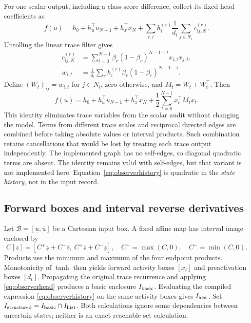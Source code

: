 \documentclass[11pt,a4paper]{article}
\theoremstyle{definition}\newtheorem{definition}[theorem]{Definition}
\begin{document}
For one scalar output, including a class-score difference, collect its fixed head coefficients as
\begin{equation}
 f(u)=h_0+h_u^\top u_{N-1}+h_x^\top x_N
       +\sum_{r,i}h^{(r)}_i\frac1{d_i}\sum_{j\in N_i}c^{(r)}_{ij,N}.
 \label{eq:observerhead}
\end{equation}
Unrolling the linear trace filter gives
\begin{align}
 c^{(r)}_{ij,N}&=\sum_{t=0}^{N-1}\beta_r(1-\beta_r)^{N-1-t}x_{i,t}x_{j,t},\\
 w_{i,t}&=\frac1{d_i}\sum_r h^{(r)}_i\beta_r(1-\beta_r)^{N-1-t}. \label{eq:tracecompile}
\end{align}
Define $(W_t)_{ij}=w_{i,t}$ for $j\in N_i$, zero otherwise, and $M_t=W_t+W_t^\top$. Then
\begin{equation}
 f(u)=h_0+h_u^\top u_{N-1}+h_x^\top x_N
                    +\frac12\sum_{t=0}^{N-1}x_t^\top M_tx_t.
 \label{eq:observerhistory}
\end{equation}
This identity eliminates trace variables from the scalar audit without changing the model. Terms from different trace scales and reciprocal directed edges are combined before taking absolute values or interval products. Such combination retains cancellations that would be lost by treating each trace output independently. The implemented graph has no self-edges, so diagonal quadratic terms are absent. The identity remains valid with self-edges, but that variant is not implemented here. Equation~\eqref{eq:observerhistory} is quadratic in the \emph{state history}, not in the input record.

\subsection{Forward boxes and interval reverse derivatives}
Let $\mathcal B=[\underline u,\overline u]$ be a Cartesian input box. A fixed affine map has interval image enclosed by
\[
 C[z]=[C^+\underline z+C^-\overline z,\ C^+\overline z+C^-\underline z],
 \quad C^+=\max(C,0),\quad C^-=\min(C,0).
\]
Products use the minimum and maximum of the four endpoint products. Monotonicity of $\tanh$ then yields forward activity boxes $[x_t]$ and preactivation boxes $[d_t]$. Propagating the original trace recurrence and applying \eqref{eq:observerhead} produces a basic enclosure $I_{\rm basic}$. Evaluating the compiled expression \eqref{eq:observerhistory} on the same activity boxes gives $I_{\rm hist}$. Set $I_{\rm structured}=I_{\rm basic}\cap I_{\rm hist}$. Both calculations ignore some dependencies between uncertain states; neither is an exact reachable-set calculation.
\end{document}
